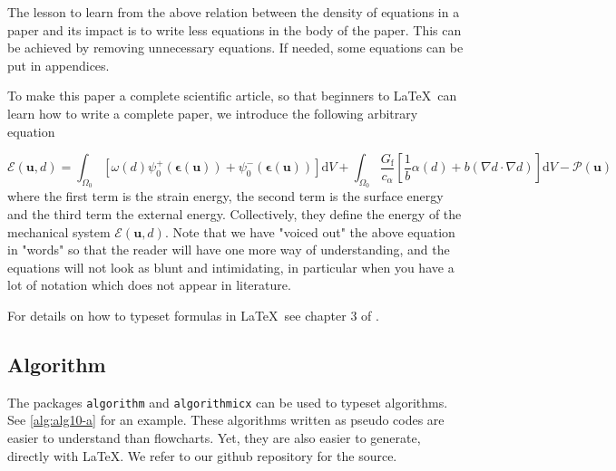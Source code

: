 \documentclass[authoryear,3p,times,preprint,review,fleqn]{elsarticle}
\newcommand{\bfepsilon}{\boldsymbol{\epsilon}}
\newcommand{\bfu}{\boldsymbol{u}}
\newcommand{\td}{\text{d}}
\numberwithin{equation}{section}
\theoremstyle{remark}
\begin{document}
The lesson to learn from the above relation between the density of equations in a paper and its impact is to write less equations in the body of the paper. This can be achieved by removing unnecessary equations. If needed, some equations can be put in appendices.

To make this paper a complete scientific article, so that beginners to \LaTeX\ can learn how to write a complete paper, we introduce the following arbitrary equation

\begin{equation}
  \mathscr{E} (\bfu, d) 
    = \int_{\varOmega_{0}} \left[\omega(d)\psi_{0}^+(\bfepsilon (\bfu)) + \psi_{0}^-(\bfepsilon (\bfu)) \right]\td V
    + \int_{\varOmega_{0}}  \frac{G_\text{f}}{c_\alpha} \left[ \frac{1}{b} \alpha(d)
    + b \left( \nabla d \cdot \nabla d \right) \right] \td V
    - \mathscr{P} (\bfu)
\label{eq:3}
\end{equation}
where the first term is the strain energy, the second term is the surface energy and the third term the external energy. Collectively, they define the energy of the mechanical system $\mathscr{E} (\bfu, d)$.  Note that we have "voiced out" the above equation in "words" so that the reader will have one more way of understanding, and the equations will not look as blunt and intimidating, in particular when you have a lot of notation which does not appear in literature. 

For details on how to typeset formulas in \LaTeX\, see chapter 3 of \cite{latex}.



\subsection{Algorithm}\label{sec:algorithm}

The packages \texttt{algorithm} and \texttt{algorithmicx} can be used to typeset algorithms. See  \cref{alg:alg10-a} for an example. These algorithms written as pseudo codes are easier to understand than flowcharts. Yet, they are also easier to generate, directly with \LaTeX. We refer to our github repository for the source.\\
\end{document}
